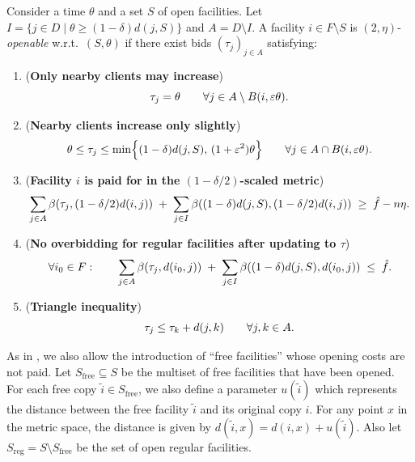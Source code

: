 \begin{definition}
\label{def:openable-mod-eta-2}
Consider a time $\theta$ and a set $S$ of open facilities.
Let $I = \{j \in D \mid \theta \geq (1-\delta) d(j, S)\}$ and $A = D \setminus I$.
A facility $i\in F\setminus S$ is $(2,\eta)$-\emph{openable} w.r.t.\ $(S,\theta)$ if there exist bids $(\tau_j)_{j\in A}$
satisfying:
\begin{enumerate}
\item[\textbf{(i)}] (\textbf{Only nearby clients may increase}) 
\[
\tau_j=\theta \qquad \forall j\in A\setminus B(i,\varepsilon\theta).
\]
\item[\textbf{(ii)}] (\textbf{Nearby clients increase only slightly})
\[
\theta \le \tau_j \leq \min\Bigl\{(1-\delta)d(j,S),\, (1+\varepsilon^2) \theta \Bigr\}
\qquad \forall j\in A\cap B(i,\varepsilon\theta).
\]
\item[\textbf{(iii)}] (\textbf{Facility $i$ is paid for in the $(1-\delta/2)$-scaled metric})
\[
\sum_{j\in A}\beta(\tau_j, (1-\delta/2)d(i,j))
\;+\;
\sum_{j\in I}\beta((1-\delta)d(j,S), (1-\delta/2)d(i,j))
\;\ge\; \hat f - n \eta.
\]
\item[\textbf{(iv)}] (\textbf{No overbidding for regular facilities after updating to $\tau$})
\[
\forall i_0\in F:\qquad
\sum_{j\in A}\beta(\tau_j,d(i_0,j))
\;+\;
\sum_{j\in I}\beta((1-\delta)  d(j,S), d(i_0,j))
\;\le\; \hat f.
\]
\item[\textbf{(v)}] (\textbf{Triangle inequality})
\[
\tau_j \le \tau_k + d(j,k)
\qquad \forall j,k\in A.
\]
\end{enumerate}
\end{definition}

As in \cite{MR4928455-Cohen25}, we also allow the introduction of ``free facilities'' whose opening costs are not paid.
Let $S_{\mathrm{free}} \subseteq S$ be the multiset of free facilities that have been opened.
For each free copy $\tilde{i} \in S_{\mathrm{free}}$, we also define a parameter $u(\tilde{i})$ which represents the distance between the free facility $\tilde{i}$ and its original copy $i$.
For any point $x$ in the metric space, the distance is given by $d(\tilde{i}, x) = d(i, x) + u(\tilde{i})$.
Also let $S_{\mathrm{reg}} = S \setminus S_{\mathrm{free}}$ be the set of open regular facilities.

